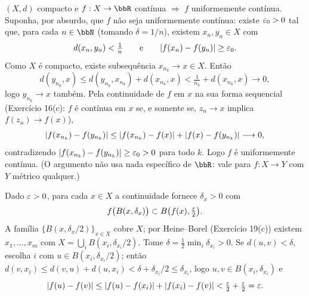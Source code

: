 \begin{exercicio}{$(X,d)$ compacto e $f:X\to\R$ contínua $\Rightarrow$ $f$ uniformemente contínua.}
\sol
Suponha, por absurdo, que $f$ não seja uniformemente contínua: existe $\varepsilon_0>0$ tal que, para cada $n\in\N$ (tomando $\delta=1/n$), existem $x_n,y_n\in X$ com
\[ d(x_n,y_n)<\tfrac1n \qquad\text{e}\qquad \lvert f(x_n)-f(y_n)\rvert\ge\varepsilon_0. \]
Como $X$ é compacto, existe subsequência $x_{n_k}\to x\in X$. Então
\[ d(y_{n_k},x)\le d(y_{n_k},x_{n_k})+d(x_{n_k},x)<\tfrac{1}{n_k}+d(x_{n_k},x)\longrightarrow 0, \]
logo $y_{n_k}\to x$ também. Pela continuidade de $f$ em $x$ na sua forma sequencial (Exercício 16(c): $f$ é contínua em $x$ se, e somente se, $z_n\to x$ implica $f(z_n)\to f(x)$),
\[ \lvert f(x_{n_k})-f(y_{n_k})\rvert\le\lvert f(x_{n_k})-f(x)\rvert+\lvert f(x)-f(y_{n_k})\rvert\longrightarrow 0, \]
contradizendo $\lvert f(x_{n_k})-f(y_{n_k})\rvert\ge\varepsilon_0>0$ para todo $k$. Logo $f$ é uniformemente contínua. (O argumento não usa nada específico de $\R$: vale para $f:X\to Y$ com $Y$ métrico qualquer.)

\begin{obs}
Dado $\varepsilon>0$, para cada $x\in X$ a continuidade fornece $\delta_x>0$ com
\[ f\bigl(B(x,\delta_x)\bigr)\subset B\bigl(f(x),\tfrac{\varepsilon}2\bigr). \]
A família $\{B(x,\delta_x/2)\}_{x\in X}$ cobre $X$; por Heine--Borel (Exercício 19(c)) existem $x_1,\dots,x_m$ com $X=\bigcup_iB(x_i,\delta_{x_i}/2)$. Tome $\delta=\frac12\min_i\delta_{x_i}>0$. Se $d(u,v)<\delta$, escolha $i$ com $u\in B(x_i,\delta_{x_i}/2)$; então $d(v,x_i)\le d(v,u)+d(u,x_i)<\delta+\delta_{x_i}/2\le\delta_{x_i}$, logo $u,v\in B(x_i,\delta_{x_i})$ e
\[ \lvert f(u)-f(v)\rvert\le\lvert f(u)-f(x_i)\rvert+\lvert f(x_i)-f(v)\rvert<\tfrac{\varepsilon}2+\tfrac{\varepsilon}2=\varepsilon. \]
\end{obs}
\end{exercicio}

